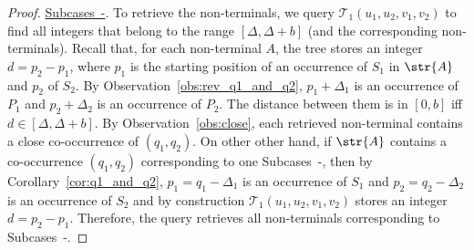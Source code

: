 \begin{proof}
\underline{Subcases~-}. To retrieve the non-terminals, we query $\mathcal{T}_1(u_1, u_2,v_1, v_2)$ to find all integers that belong to the range $[\Delta,\Delta+b]$ (and the corresponding non-terminals). Recall that, for each non-terminal $A$, the tree stores an integer $d = p_2-p_1$, where $p_1$ is the starting position of an occurrence of $S_1$ in $\str{A}$ and $p_2$ of $S_2$. By Observation~\ref{obs:rev_q1_and_q2}, $p_1+\Delta_1$ is an occurrence of $P_1$ and $p_2+\Delta_2$ is an occurrence of $P_2$. The distance between them is in $[0,b]$ iff $d \in [\Delta,\Delta+b]$. By Observation~\ref{obs:close}, each retrieved non-terminal contains a close co-occurrence of $(q_1,q_2)$. On other other hand, if $\str{A}$ contains a co-occurrence $(q_1,q_2)$ corresponding to one Subcases~-, then by Corollary~\ref{cor:q1_and_q2}, $p_1 = q_1-\Delta_1$ is an occurrence of $S_1$ and $p_2 = q_2-\Delta_2$ is an occurrence of $S_2$ and by construction $\mathcal{T}_1(u_1, u_2,v_1, v_2)$ stores an integer $d = p_2-p_1$. Therefore, the query retrieves all non-terminals corresponding to Subcases~-. 


\end{proof}
